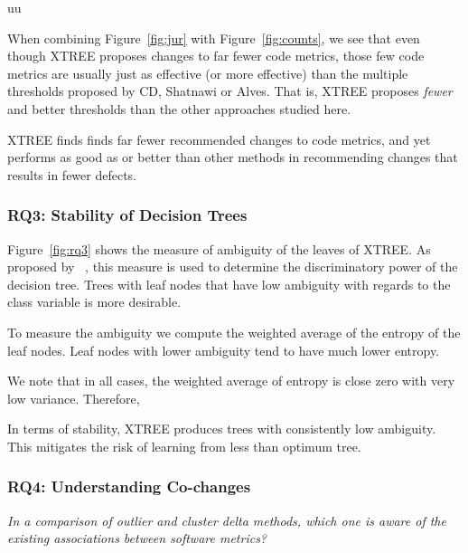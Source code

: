uu \documentclass[final,twocolumn,5p]{elsarticle}
\newcommand{\fig}[1]{Figure~\ref{fig:#1}}
\theoremstyle{break}
\begin{document}
\begin{itemize}
% 


When combining  \fig{jur} with \fig{counts}, we   see that
even though XTREE proposes changes to far fewer code metrics, those few
code metrics are usually just as effective (or
more effective) than the multiple
thresholds
proposed by CD, Shatnawi or Alves.  That is, XTREE proposes
{\em fewer} and better thresholds than the other approaches studied here.

\begin{lesson}
XTREE finds finds far fewer recommended changes to code metrics, and yet performs as good as or better than other methods in recommending changes that results in fewer defects.
\end{lesson}



\subsubsection{RQ3: Stability of Decision Trees}


\fig{rq3} shows the measure of ambiguity of the leaves of XTREE. As proposed by ~\cite{osei04}, this measure is used to determine the discriminatory power of the decision tree. Trees with leaf nodes that have low ambiguity with regards to the class variable is more desirable. 

To measure the ambiguity we compute the weighted average of the entropy of the leaf nodes. Leaf nodes with lower ambiguity tend to have much lower entropy. 

We note that in all cases, the weighted average of entropy is close zero with very low variance. Therefore, 

\begin{lesson}
In terms of stability, XTREE produces trees with consistently low ambiguity. This mitigates the risk of learning from less than optimum tree.
\end{lesson}


\subsubsection{RQ4: Understanding Co-changes}

{\em In a comparison of outlier and cluster delta
methods, which one is aware of the existing associations between software metrics?}


\end{itemize}
\end{document}

